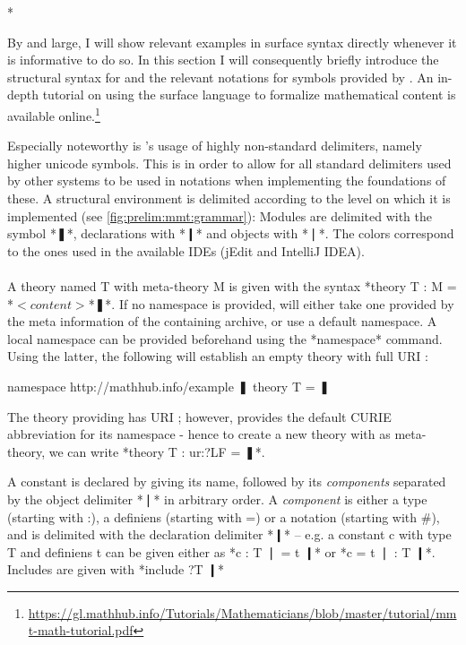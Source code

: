 \lstMakeShortInline[language=mmt]*

By and large, I will show relevant examples in \mmt surface syntax directly whenever it is informative to do so. In this section I will consequently briefly introduce the structural syntax for \mmt and the relevant notations for symbols provided by \LF. An in-depth tutorial on using the \mmt surface language to formalize mathematical content is available online.\footnote{\url{https://gl.mathhub.info/Tutorials/Mathematicians/blob/master/tutorial/mmt-math-tutorial.pdf}} 

Especially noteworthy is \mmt's usage of highly non-standard delimiters, namely higher unicode symbols. This is in order to allow for all standard delimiters used by other systems to be used in notations when implementing the foundations of these. A structural environment is delimited according to the level on which it is implemented (see \autoref{fig:prelim:mmt:grammar}): Modules are delimited with the symbol *❚*, declarations with *❙* and objects with *❘*. The colors correspond to the ones used in the available \mmt IDEs (jEdit and IntelliJ IDEA).

\paragraph{} A theory named \cn T with meta-theory \cn M is given with the syntax *theory T : M = *$<content>$*❚*. If no namespace is provided, \mmt will either take one provided by the meta information of the containing archive, or use a default namespace. A local namespace can be provided beforehand using the *namespace* command. Using the latter, the following will establish an empty theory with full URI :

\begin{mmtcode}
namespace http://mathhub.info/example ❚
theory T = ❚
\end{mmtcode}

The theory providing \LF has URI ; however, \mmt provides the default CURIE abbreviation  for its namespace - hence to create a new theory with \LF as meta-theory, we can write *theory T : ur:?LF = ❚*.

A constant is declared by giving its name, followed by its \emph{components} separated by the object delimiter *❘* in arbitrary order. A \emph{component} is either a type (starting with \cn:), a definiens (starting with \cn=) or a notation (starting with \cn\#), and is delimited with the declaration delimiter *❙* -- e.g. a constant \cn c with type \cn T and definiens \cn t can be given either as *c : T ❘ = t ❙* or *c = t ❘ : T ❙*. Includes are given with *include ?T ❙*

